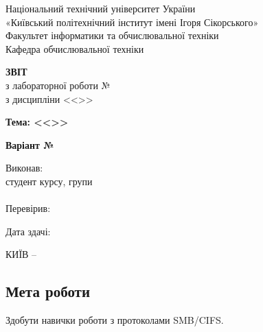 \documentclass[14pt, a4paper]{extreport}
\begin{document}
	
	\begin{titlepage}
		\begin{center}
			\normalsize
			Національний технічний університет України\\
			«Київський політехнічний інститут імені Ігоря Сікорського» \\[0.5em]
			Факультет інформатики та обчислювальної техніки\\
			Кафедра обчислювальної техніки
			
			\vfill
			
			{\large \textbf{ЗВІТ}\\[0.5em]}
			{з лабораторної роботи №\LabNumber \\}
			{з дисципліни <<\CourseTitle>>}
			
			\vspace{2em}
			
			{\textbf{Тема: <<\Topic>>}}
			
			\vspace{1em}
			
			{\textbf{Варіант №\Variant}}
			
			\vfill
			
			\begin{flushright}
				Виконав: \\ студент \CourseNumber{} курсу, групи \StudentGroup \\
				\StudentName \\[1em]
				Перевірив: \\ \Teacher
			\end{flushright}
			
			\vfill
			
			\begin{flushright}
				Дата здачі: \DTMtoday
			\end{flushright}
			
			\vspace{5em}
			КИЇВ -- \ReportYear
		\end{center}
	\end{titlepage}
	
	\clearpage
	\setcounter{page}{2}
	
	\subsection*{Мета роботи} 
	
	Здобути навички роботи з протоколами SMB/CIFS.
	
\end{document}
